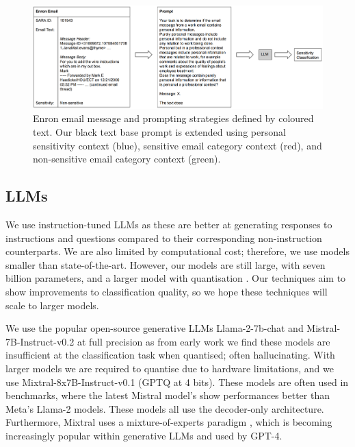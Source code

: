 \begin{figure}
\begin{center}
\includegraphics[scale=0.3]{figures/inputprompt.pdf}
\end{center}
\caption{\label{fig-input}Enron email message and prompting strategies defined by coloured text. Our black text base prompt is extended using personal sensitivity context (blue), sensitive email category context (red), and non-sensitive email category context (green).}
\end{figure}

\subsection{LLMs}
\label{sec:experiment:LLMs}
We use instruction-tuned LLMs as these are better at generating responses to instructions and questions compared to their corresponding non-instruction counterparts. We are also limited by computational cost; therefore, we use models smaller than state-of-the-art. However, our models are still large, with seven billion parameters, and a larger model with quantisation \cite{frantar2022gptq}. Our techniques aim to show improvements to classification quality, so we hope these techniques will scale to larger models.

We use the popular open-source generative LLMs Llama-2-7b-chat and Mistral-7B-Instruct-v0.2 at full precision as from early work we find these models are insufficient at the classification task when quantised; often hallucinating. With larger models we are required to quantise due to hardware limitations, and we use Mixtral-8x7B-Instruct-v0.1 (GPTQ at 4 bits). These models are often used in benchmarks, where the latest Mistral model’s show performances better than Meta’s Llama-2 models. These models all use the decoder-only architecture. Furthermore, Mixtral uses a mixture-of-experts paradigm \cite{jacobs1991adaptive, shazeer2017outrageously}, which is becoming increasingly popular within generative LLMs and used by GPT-4. 

